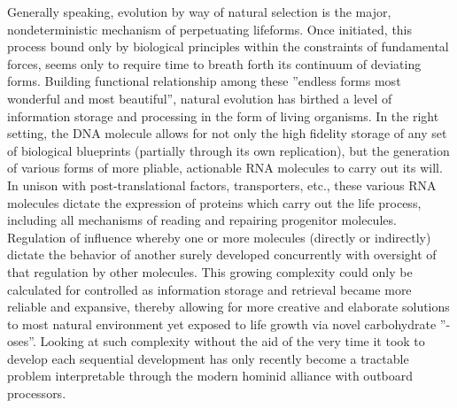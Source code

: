 Generally speaking, evolution by way of natural selection is the major, nondeterministic mechanism of perpetuating lifeforms. Once initiated, this process bound only by biological principles within the constraints of fundamental forces, seems only to require time to breath forth its continuum of deviating forms. Building functional relationship among these ''endless forms most wonderful and most beautiful''\citep{darwin1869origin}, natural evolution has birthed a level of information storage and processing in the form of living organisms. In the right setting, the DNA molecule allows for not only the high fidelity storage of any set of biological blueprints (partially through its own replication), but the generation of various forms of more pliable, actionable RNA molecules to carry out its will\cite{roeder1991complexities}. In unison with post-translational factors, transporters, etc., these various RNA molecules dictate the expression of proteins which carry out the life process, including all mechanisms of reading and repairing progenitor molecules. Regulation of influence whereby one or more molecules (directly or indirectly) dictate the behavior of another surely developed concurrently with oversight of that regulation by other molecules. This growing complexity could only be calculated for controlled as information storage and retrieval became more reliable and expansive, thereby allowing for more creative and elaborate solutions to most natural environment yet exposed to life \eg growth via novel carbohydrate ''-oses''. Looking at such complexity without the aid of the very time it took to develop each sequential development has only recently become a tractable problem interpretable through the modern hominid alliance with outboard processors.


